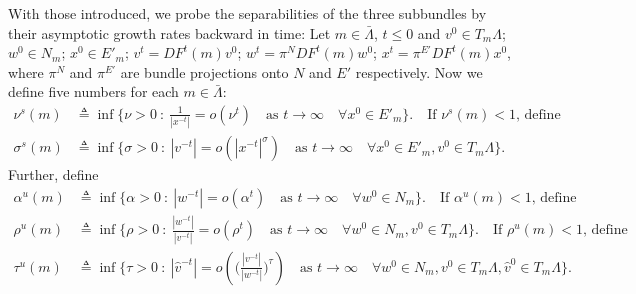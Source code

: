 \documentclass[a4paper,11pt]{article}
\theoremstyle{remark}
\begin{document}
With those introduced, we probe the separabilities of the three subbundles by their asymptotic growth rates backward in time: Let $m\in \bar{\Lambda}$, $t\le0$ and $v^0 \in T_m \Lambda$; $w^0\in N_m$; $x^0\in E'_m$; $v^t = DF^t(m)v^0$; $w^t = \pi^N DF^t(m)w^0$; $x^t = \pi^{E'}DF^t(m)x^0$,
where $\pi^N$ and $\pi^{E'}$ are bundle projections onto $N$ and $E'$ respectively.
Now we define five numbers for each $m\in \bar{\Lambda}$:
\begin{align*}
 \nu^s(m) &\triangleq \inf \Big\{\nu>0 \: : \: \frac{1}{|x^{-t}|} = o(\nu^t) \quad \text{as $t \rightarrow \infty$} \quad \forall x^0\in E'_m\Big\}. \quad \text{If $\nu^s(m)<1$, define}\\
 \sigma^s(m) &\triangleq \inf \Big\{\sigma>0 \: : \: |v^{-t}| = o(|x^{-t}|^\sigma) \quad \text{as $t \rightarrow \infty$} \quad \forall x^0\in E'_m, v^0\in T_m\Lambda\Big\}.
\end{align*}
Further, define
\begin{align*}
 \alpha^u(m) &\triangleq \inf \Big\{\alpha>0 \: : \: |w^{-t}| = o(\alpha^t) \quad \text{as $t \rightarrow \infty$}\quad \forall w^0\in N_m\Big\}. \quad \text{If $\alpha^u(m)<1$, define}\\
 \rho^u(m) &\triangleq \inf \Big\{\rho>0 \: : \: \frac{|w^{-t}|}{|v^{-t}|} = o(\rho^t) \quad \text{as $t \rightarrow \infty$} \quad \forall w^0\in N_m, v^0\in T_m\Lambda\Big\}.\quad \text{If $\rho^u(m)<1$, define}\\
 \tau^u(m) &\triangleq \inf \Big\{\tau>0 \: : \: |\hat{v}^{-t}| = o\left(\Big(\frac{|v^{-t}|}{|w^{-t}|}\Big)^{\tau}\right) \quad \text{as $t \rightarrow \infty$} \quad \forall w^0\in N_m, v^0\in T_m\Lambda,\hat{v}^0\in T_m\Lambda\Big\}.
\end{align*}
\end{document}
